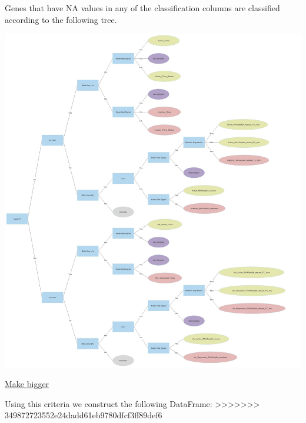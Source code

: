 \documentclass[11pt]{article}
\begin{document}
Genes that have NA values in any of the classification columns are classified according to the following tree.
\begin{center}
\includegraphics[width=.9\linewidth]{./Plots/active_genes_NAs.jpg}
\end{center}

\href{Plots/active\_genes\_NAs.jpg}{Make bigger}

Using this criteria we construct the following DataFrame:
>>>>>>> 349872723552e24dadd61eb9780dfcf3ff89def6
\end{document}
